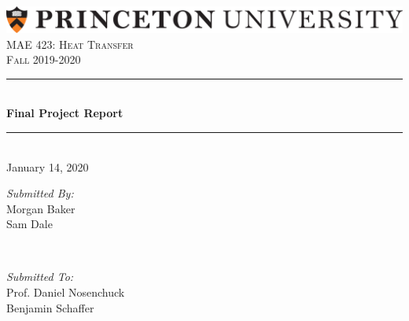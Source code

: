 

%

\begin{titlepage}

\newcommand{\HRule}{\rule{\linewidth}{0.5mm}} %

\center %
 
\includegraphics[width=\columnwidth]{images/PU1linehighres.png}\\[1.5cm]
\textsc{\Large MAE 423: Heat Transfer}\\[0.5cm] %
\textsc{\large Fall 2019-2020}\\[1.5cm] %


\HRule \\[0.6cm]
{ \huge \bfseries Final Project Report}\\[0.4cm] %
\HRule \\[2cm]

{\Large January 14, 2020}\\[3cm] %

 

\begin{minipage}[t]{0.4\textwidth}
\begin{flushleft} \large
\emph{Submitted By:}\\
Morgan Baker\\
Sam Dale\\
\end{flushleft}
\end{minipage}
~
\begin{minipage}[t]{0.4\textwidth}
\begin{flushright} \large
\emph{Submitted To:} \\
Prof. Daniel Nosenchuck\\
Benjamin Schaffer\\
\end{flushright}
\end{minipage}\\[1cm]

\vfill %

\end{titlepage}


%